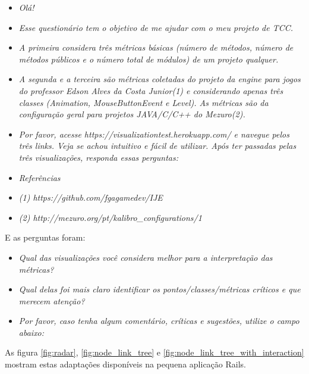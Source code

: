 \begin{itemize}
  \item[] \textit{Olá!}
  \item[] \textit{Esse questionário tem o objetivo de me ajudar com o meu projeto de TCC.}
  \item[] \textit{A primeira considera três métricas básicas (número de métodos, número de métodos públicos e o número total de módulos) de um projeto qualquer.}
  \item[] \textit{A segunda e a terceira são métricas coletadas do projeto da engine para jogos do professor Edson Alves da Costa Junior(1) e considerando apenas três classes (Animation, MouseButtonEvent e Level). As métricas são da configuração geral para projetos JAVA/C/C++ do Mezuro(2).}
	\item[] \textit{Por favor, acesse https://visualizationtest.herokuapp.com/ e navegue pelos três links. Veja se achou intuitivo e fácil de utilizar. Após ter passadas pelas três visualizações, responda essas perguntas:}
	\item[] \textit{Referências}
	\item[] \textit{(1) https://github.com/fgagamedev/IJE}
	\item[] \textit{(2) http://mezuro.org/pt/kalibro\_configurations/1}
\end{itemize}

E as perguntas foram:

\begin{itemize}
  \item[] \textit{Qual das visualizações você considera melhor para a interpretação das métricas?}
  \item[] \textit{Qual delas foi mais claro identificar os pontos/classes/métricas críticos e que merecem atenção?}
  \item[] \textit{Por favor, caso tenha algum comentário, críticas e sugestões, utilize o campo abaixo:}
\end{itemize}

As figura \ref{fig:radar}, \ref{fig:node_link_tree} e \ref{fig:node_link_tree_with_interaction} mostram estas adaptações disponíveis na pequena aplicação Rails.

